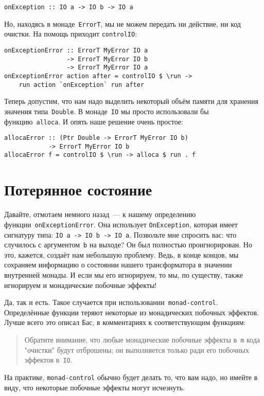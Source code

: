 \begin{lstlisting}
onException :: IO a -> IO b -> IO a
\end{lstlisting}

Но, находясь в монаде~\lstinline'ErrorT', мы не можем передать ни действие, ни код очистки. На
помощь приходит \lstinline'controlIO':

\begin{lstlisting}
onExceptionError :: ErrorT MyError IO a
                 -> ErrorT MyError IO b
                 -> ErrorT MyError IO a
onExceptionError action after = controlIO $ \run ->
    run action `onException` run after
\end{lstlisting}

Теперь допустим, что нам надо выделить некоторый объём памяти для хранения значения типа~\lstinline'Double'. В монаде~\lstinline'IO'
мы просто использовали бы функцию~\lstinline'alloca'. И опять наше
решение очень простое:

\begin{lstlisting}
allocaError :: (Ptr Double -> ErrorT MyError IO b)
            -> ErrorT MyError IO b
allocaError f = controlIO $ \run -> alloca $ run . f
\end{lstlisting}

\section{Потерянное состояние}
Давайте, отмотаем немного назад~--- к нашему определению функции~\lstinline'onExceptionError'. Она использует \lstinline'OnException',
которая имеет сигнатуру типа: \lstinline'IO a -> IO b -> IO a'. Позвольте мне спросить вас:
что случилось с аргументом~\lstinline'b' на выходе? Он был полностью проигнорирован. Но это,
кажется, создаёт нам небольшую проблему. Ведь, в конце концов, мы сохраняем
информацию о состоянии нашего трансформатора в значении внутренней монады. И
если мы его игнорируем, то мы, по существу, также игнорируем и монадические побочные
эффекты!

Да, так и есть. Такое случается при использовании~\texttt{monad-control}. Определённые функции
теряют некоторые из монадических побочных эффектов. Лучше всего это описал
Бас, в комментариях к соответствующим функциям:
\begin{quote}
Обратите внимание, что любые монадические побочные эффекты в~\lstinline'm' кода "очистки"
будут отброшены; он выполняется только ради его побочных эффектов в~\lstinline'IO'.
\end{quote}
На практике, \texttt{monad-control} обычно будет делать то, что вам надо, но
имейте в виду, что некоторые побочные эффекты могут исчезнуть.

